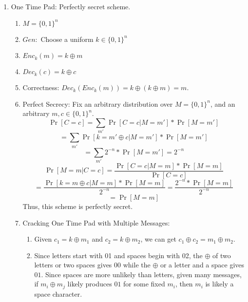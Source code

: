 \documentclass[12pt,letterpaper]{article}
\begin{document}
\begin{enumerate}
        \item One Time Pad: Perfectly secret scheme.
            \begin{enumerate}
                \item $M=\{0,1\}^n$
                \item $Gen:$ Choose a uniform $k\in\{0,1\}^n$
                \item $Enc_k(m)=k\oplus m$
                \item $Dec_k(c)=k\oplus c$
                \item Correctness: $Dec_k(Enc_k(m))=k\oplus(k\oplus m)=m$.
                \item Perfect Secrecy: Fix an arbitrary distribution over $M=\{0,1\}^n$, and an arbitrary $m,c\in \{0,1\}^n$.
                    \[\Pr[C=c]=\sum_{m'}\Pr[C=c|M=m']*\Pr[M=m']\]
                    \[=\sum_{m'}\Pr[k=m'\oplus c|M=m']*\Pr[M=m']\]
                    \[=\sum_{m'}2^{-n}*\Pr[M=m']=2^{-n}\]
                    \[\Pr[M=m|C=c]=\frac{\Pr[C=c|M=m]*\Pr[M=m]}{\Pr[C=c]}\]
                    \[=\frac{\Pr[k=m\oplus c|M=m]*\Pr[M=m]}{2^{-n}}=\frac{2^{-n}*\Pr[M=m]}{2^{-n}}\]
                \[=\Pr[M=m]\]
                Thus, this scheme is perfectly secret.
            \item Cracking One Time Pad with Multiple Messages:
                \begin{enumerate}
                    \item Given $c_1=k\oplus m_1$ and $c_2=k\oplus m_2$, we can get $c_1\oplus c_2=m_1\oplus m_2$.
                    \item Since letters start with 01 and spaces begin with 02, the $\oplus$ of two letters or two spaces gives 00 while the $\oplus$ or a letter and a space gives $01$. Since spaces are more unlikely than letters, given many messages, if $m_i\oplus m_j$ likely produces $01$ for some fixed $m_i$, then $m_i$ is likely a space character.
                \end{enumerate}
            \end{enumerate}\newpage


\end{enumerate}
\end{document}
